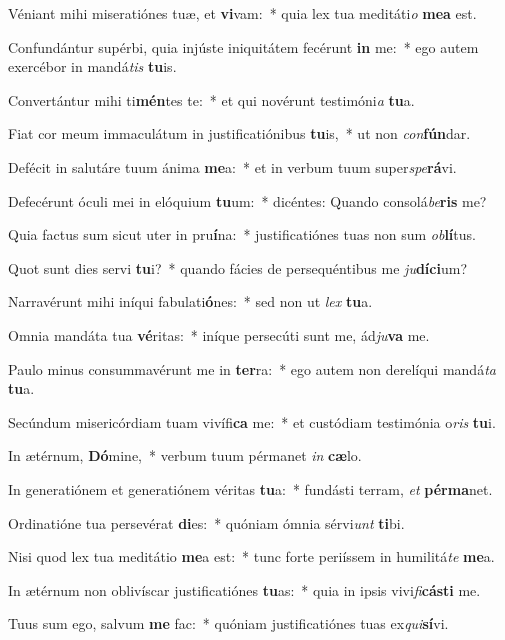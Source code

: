 \item Véniant mihi miseratiónes tuæ, et \textbf{vi}vam:~* quia lex tua meditáti\textit{o} \textbf{me}\textbf{a} est.
\item Confundántur supérbi, quia injúste iniquitátem fecérunt \textbf{in} me:~* ego autem exercébor in mandá\textit{tis} \textbf{tu}is.
\item Convertántur mihi ti\textbf{mén}tes te:~* et qui novérunt testimóni\textit{a} \textbf{tu}a.
\item Fiat cor meum immaculátum in justificatiónibus \textbf{tu}is,~* ut non \textit{con}\textbf{fún}dar.
\item Defécit in salutáre tuum ánima \textbf{me}a:~* et in verbum tuum super\textit{spe}\textbf{rá}vi.
\item Defecérunt óculi mei in elóquium \textbf{tu}um:~* dicéntes: Quando consolá\textit{be}\textbf{ris} me?
\item Quia factus sum sicut uter in pru\textbf{í}na:~* justificatiónes tuas non sum \textit{ob}\textbf{lí}tus.
\item Quot sunt dies servi \textbf{tu}i?~* quando fácies de persequéntibus me \textit{ju}\textbf{dí}\textbf{ci}um?
\item Narravérunt mihi iníqui fabulati\textbf{ó}nes:~* sed non ut \textit{lex} \textbf{tu}a.
\item Omnia mandáta tua \textbf{vé}ritas:~* iníque persecúti sunt me, ád\textit{ju}\textbf{va} me.
\item Paulo minus consummavérunt me in \textbf{ter}ra:~* ego autem non derelíqui mandá\textit{ta} \textbf{tu}a.
\item Secúndum misericórdiam tuam vivífi\textbf{ca} me:~* et custódiam testimónia o\textit{ris} \textbf{tu}i.
\item In ætérnum, \textbf{Dó}mine,~* verbum tuum pérmanet \textit{in} \textbf{cæ}lo.
\item In generatiónem et generatiónem véritas \textbf{tu}a:~* fundásti terram, \textit{et} \textbf{pér}\textbf{ma}net.
\item Ordinatióne tua persevérat \textbf{di}es:~* quóniam ómnia sérvi\textit{unt} \textbf{ti}bi.
\item Nisi quod lex tua meditátio \textbf{me}a est:~* tunc forte periíssem in humilitá\textit{te} \textbf{me}a.
\item In ætérnum non oblivíscar justificatiónes \textbf{tu}as:~* quia in ipsis vivi\textit{fi}\textbf{cás}\textbf{ti} me.
\item Tuus sum ego, salvum \textbf{me} fac:~* quóniam justificatiónes tuas ex\textit{qui}\textbf{sí}vi.
